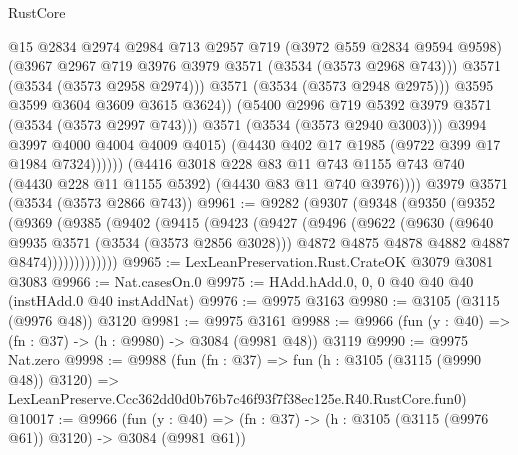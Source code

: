 \begin{lexlean}{RustCore}
\begin{coremodule}
                            @15
                            @2834
                            @2974
                            @2984
                            @713
                            @2957
                            @719
                            (@3972 @559 @2834 @9594 @9598)
                            (@3967 @2967 @719 @3976 @3979 @3571 (@3534 (@3573 @2968 @743)))
                            @3571
                            (@3534 (@3573 @2958 @2974)))
                          @3571
                          (@3534 (@3573 @2948 @2975)))
                        @3595
                        @3599
                        @3604
                        @3609
                        @3615
                        @3624))
                    (@5400 @2996 @719 @5392 @3979 @3571 (@3534 (@3573 @2997 @743)))
                    @3571
                    (@3534 (@3573 @2940 @3003)))
                  @3994
                  @3997
                  @4000
                  @4004
                  @4009
                  @4015)
                (@4430 @402 @17 @1985 (@9722 @399 @17 @1984 @7324))))))
        (@4416
          @3018
          @228
          @83
          @11
          @743
          @1155
          @743
          @740
          (@4430 @228 @11 @1155 @5392)
          (@4430 @83 @11 @740 @3976))))
    @3979
    @3571
    (@3534 (@3573 @2866 @743))
@9961 := @9282
    (@9307
      (@9348
        (@9350
          (@9352
            (@9369
              (@9385
                (@9402
                  (@9415
                    (@9423
                      (@9427
                        (@9496
                          (@9622
                            (@9630
                              (@9640 @9935 @3571 (@3534 (@3573 @2856 @3028)))
                              @4872
                              @4875
                              @4878
                              @4882
                              @4887
                              @8474)))))))))))))
@9965 := LexLeanPreservation.Rust.CrateOK @3079 @3081 @3083
@9966 := Nat.casesOn.{0}
@9975 := HAdd.hAdd.{0, 0, 0} @40 @40 @40 (instHAdd.{0} @40 instAddNat)
@9976 := @9975 @3163
@9980 := @3105 (@3115 (@9976 @48)) @3120
@9981 := @9975 @3161
@9988 := @9966 (fun (y : @40) => (fn : @37) -> (h : @9980) -> @3084 (@9981 @48)) @3119
@9990 := @9975 Nat.zero
@9998 := @9988
    (fun (fn : @37) =>
    fun (h : @3105 (@3115 (@9990 @48)) @3120) =>
    LexLeanPreserve.Ccc362dd0d0b76b7c46f93f7f38ec125e.R40.RustCore.fun0)
@10017 := @9966
    (fun (y : @40) => (fn : @37) -> (h : @3105 (@3115 (@9976 @61)) @3120) -> @3084 (@9981 @61))

\end{coremodule}
\end{lexlean}
